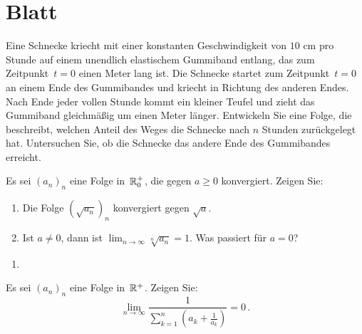 \section{Blatt}

\begin{aufg}[6 Punkte] 
Eine Schnecke kriecht mit einer konstanten Geschwindigkeit von $10$ cm pro Stunde auf einem unendlich elastischem Gummiband entlang, das zum Zeitpunkt~$t=0$ einen Meter lang ist. Die Schnecke startet zum Zeitpunkt~$t=0$ an einem Ende des Gummibandes und kriecht in Richtung des anderen Endes. Nach Ende jeder vollen Stunde kommt ein kleiner Teufel und zieht das Gummiband gleichm\"a{\ss}ig um einen Meter l\"anger. Entwickeln Sie eine Folge, die beschreibt, welchen Anteil des Weges die Schnecke nach $n$ Stunden zur\"uckgelegt hat. Untersuchen Sie, ob die Schnecke das andere Ende des Gummibandes erreicht.
\end{aufg}

\bigskip

\begin{lsg}
\end{lsg}

\bigskip

\begin{aufg}[6 Punkte]
Es sei $(a_n)_n$ eine Folge in~$\mathbb{R}^+_0$, die gegen $a\geq 0$ konvergiert. Zeigen  Sie:
\begin{enumerate}[label=$\mathrm{(\roman*)}$, ref=$\mathrm{\roman*}$]
 \item Die Folge $(\sqrt{a_n})_n$ konvergiert gegen $\sqrt{a}$.
 \item Ist $a\not=0$, dann ist $\lim_{n\to\infty} \sqrt[n]{a_n} = 1$. Was passiert f\"ur $a=0$?
\end{enumerate}
\end{aufg}
 
\bigskip

\begin{lsg}
\begin{enumerate}[label=$\mathrm{(\roman*)}$, ref=$\mathrm{\roman*}$]
\item 
\end{enumerate}
\end{lsg}


\bigskip


\begin{aufg}[6 Punkte]
Es sei $(a_n)_n$ eine Folge in~$\mathbb{R}^+$. Zeigen Sie:
\[
 \lim_{n\to\infty} \frac{1}{\sum_{k=1}^n (a_k + \frac{1}{a_k})} = 0\,.
\]
\end{aufg}

